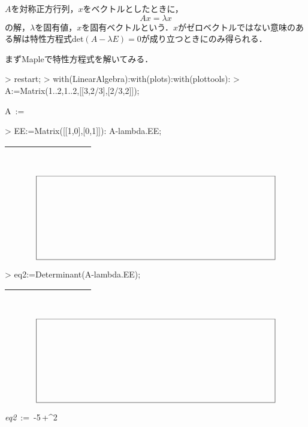 $A$を対称正方行列，$x$をベクトルとしたときに，
\begin{equation}
Ax = \lambda x
\label{Eq:Eigen}
\end{equation}
の解，$\lambda$を固有値，$x$を固有ベクトルという．$x$がゼロベクトルではない意味のある解は特性方程式det$(A-\lambda E)=0$が成り立つときにのみ得られる．

まずMapleで特性方程式を解いてみる．

\begin{MapleInput}
> restart;
> with(LinearAlgebra):with(plots):with(plottools):
> A:=Matrix(1..2,1..2,[[3,2/3],[2/3,2]]);
\end{MapleInput}

\begin{MapleOutput}
A\, := \, \left[ \begin {array}{cc} 3&2/3\\2/3&2\end {array} \right]
\end{MapleOutput}

\begin{MapleInput}
> EE:=Matrix([[1,0],[0,1]]):
  A-lambda.EE;
\end{MapleInput}

\ifHIKI
\begin{tabular}{|c|}
\hline
　　　　　　　　 \\ 
\hline
\end{tabular}
\else
\begin{equation*}
\setlength{\unitlength}{1cm}
\begin{picture}(10,3.5)
\put(0,0){\framebox(10,3.5){}}
\end{picture}
\end{equation*}
\fi

\begin{MapleInput}
> eq2:=Determinant(A-lambda.EE);
\end{MapleInput}

\ifHIKI
\begin{tabular}{|c|}
\hline
　　　　　　　　 \\ 
\hline
\end{tabular}
\else
\begin{equation*}
\setlength{\unitlength}{1cm}
\begin{picture}(10,3.5)
\put(0,0){\framebox(10,3.5){}}
\end{picture}
\end{equation*}
\fi

\begin{MapleOutput}
{\it eq2}\, := \,{}-5\,\lambda+{\lambda}^{2}
\end{MapleOutput}

